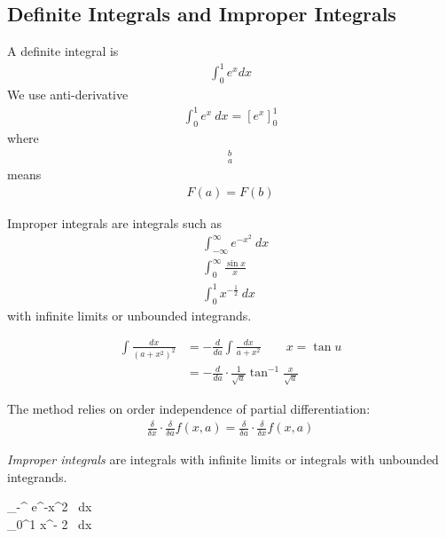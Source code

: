 \subsection{Definite Integrals and Improper Integrals}
\begin{nex}
	\item
	A definite integral is
	\begin{align*}
		\int_0^1 e^x dx
	\end{align*}
	We use anti-derivative
	\begin{align*}
	\int_0^1 e^x ~dx = [e^x]_0^1 
	\end{align*}
	where
	\begin{align*}
	[F(x)]_a^b
	\end{align*}
	means 
	\begin{align*}
	F(a) = F(b)
	\end{align*}
	\item
	Improper integrals are integrals such as 
	\begin{align*}
	& \int_{-\infty}^\infty e^{-x^2} ~ dx \\
	& \int_0^\infty \frac{\sin x}{x} \\
	& \int_0^1 x^{-\frac 1 2}~dx
	\end{align*}
	with infinite limits or unbounded integrands.
\end{nex}


\begin{align*}
\int \frac{dx}{(a+x^2)^2} & = - \frac d {da} \int \frac{dx}{a+x^2}\qquad x = \tan u  \\
& = -\frac{d}{da} \cdot \frac{1}{\sqrt{a}} \tan^{-1} \frac{x}{\sqrt{a}}
\end{align*}

The method relies on order independence of partial differentiation:
\begin{align*}
\frac{\delta}{\delta x} \cdot \frac{\delta}{\delta a} f(x,a) = \frac{\delta}{\delta a} \cdot \frac{\delta}{\delta x} f(x,a)
\end{align*}

\begin{df}
\emph{Improper integrals} are integrals with infinite limits or integrals with unbounded integrands.
\end{df}
\begin{nex}
	\begin{itemal}
		\int_{-\infty}^{\infty} e^{-x^2} ~dx \\
		\int_0^1 x^{- 2} ~dx
	\end{itemal}
\end{nex}

